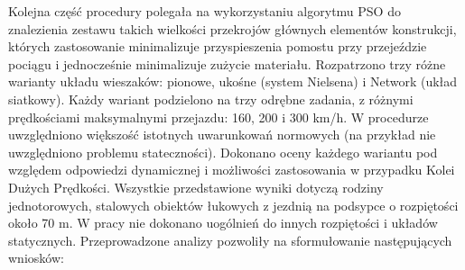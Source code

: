 Kolejna część procedury polegała na wykorzystaniu algorytmu PSO do znalezienia zestawu takich wielkości przekrojów głównych elementów konstrukcji, których zastosowanie minimalizuje przyspieszenia pomostu przy przejeździe pociągu i jednocześnie minimalizuje zużycie materiału. Rozpatrzono trzy różne warianty układu wieszaków: pionowe, ukośne (system Nielsena) i Network (układ siatkowy). Każdy wariant podzielono na trzy odrębne zadania, z różnymi prędkościami maksymalnymi przejazdu: 160, 200 i 300 km/h. W procedurze uwzględniono większość istotnych uwarunkowań normowych (na przykład nie uwzględniono problemu stateczności).
Dokonano oceny każdego wariantu pod względem odpowiedzi dynamicznej i możliwości zastosowania w przypadku Kolei Dużych Prędkości. Wszystkie przedstawione wyniki dotyczą rodziny jednotorowych, stalowych obiektów łukowych z jezdnią na podsypce o rozpiętości około 70 m. W pracy nie dokonano uogólnień do innych rozpiętości i układów statycznych. Przeprowadzone analizy pozwoliły na sformułowanie następujących wniosków:
